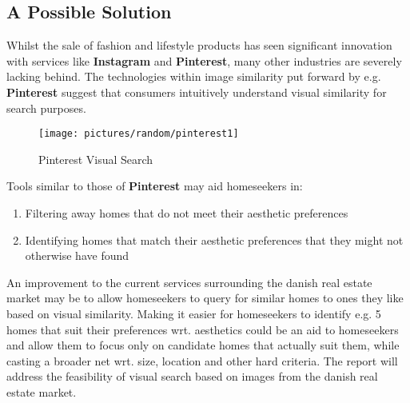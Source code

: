 \subsection{A Possible Solution}
Whilst the sale of fashion and lifestyle products has seen significant innovation with services like \textbf{Instagram} and \textbf{Pinterest}, many other industries are severely lacking behind. 
The technologies within image similarity put forward by e.g. \textbf{Pinterest}\autocite{Jing2015} suggest that consumers intuitively understand visual similarity for search purposes. 

\begin{figure}[H]
    \centering
    \texttt{[image: pictures/random/pinterest1]}
    \caption{Pinterest Visual Search}
    \label{ref:pinterest}
\end{figure}

Tools similar to those of \textbf{Pinterest} may aid homeseekers in:
\begin{enumerate}
    \item Filtering away homes that do not meet their aesthetic preferences
    \item Identifying homes that match their aesthetic preferences that they might not otherwise have found
\end{enumerate}

An improvement to the current services surrounding the danish real estate market may be to allow homeseekers to query for similar homes to ones they like based on visual similarity. 
Making it easier for homeseekers to identify e.g. 5 homes that suit their preferences wrt. aesthetics could be an aid to homeseekers and allow them to focus only on candidate homes that actually suit them, while casting a broader net wrt. size, location and other hard criteria.
\newline
The report will address the feasibility of visual search based on images from the danish real estate market.